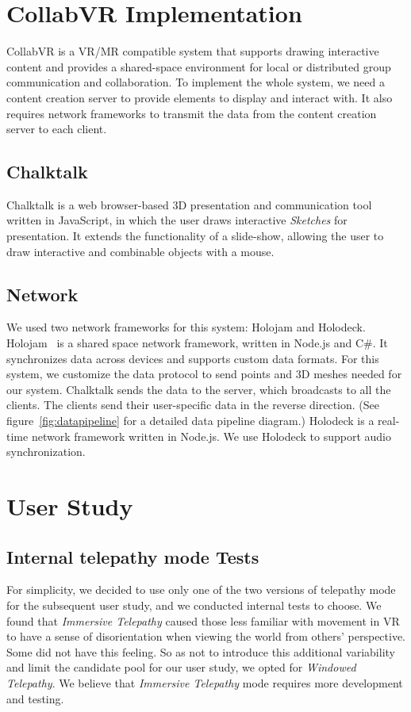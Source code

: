 \documentclass[chi_draft]{sigchi}
\begin{document}


\section{CollabVR Implementation}
CollabVR is a VR/MR compatible system that supports drawing interactive content and provides a shared-space environment for local or distributed group communication and collaboration. To implement the whole system, we need a content creation server to provide elements to display and interact with. It also requires network frameworks to transmit the data from the content creation server to each client. %
\subsection{Chalktalk} \label{sec:ct}
Chalktalk is a web browser-based 3D presentation and communication tool written in JavaScript, in which the user draws interactive \textit{Sketches} for presentation. It extends the functionality of a slide-show, allowing the user to draw interactive and combinable objects with a mouse.

\subsection{Network}
We used two network frameworks for this system: Holojam and Holodeck. Holojam~\cite{perlin2016future} is a shared space network framework, written in Node.js and C\#. It synchronizes data across devices and supports custom data formats. For this system, we customize the data protocol to send points and 3D meshes needed for our system. Chalktalk sends the data to the server, which broadcasts to all the clients. The clients send their user-specific data in the reverse direction. (See figure~\ref{fig:datapipeline} for a detailed data pipeline diagram.)
Holodeck is a real-time network framework written in Node.js. We use Holodeck to support audio synchronization.

\section{User Study}

\subsection{Internal telepathy mode Tests}
For simplicity, we decided to use only one of the two versions of telepathy mode for the subsequent user study, and we conducted internal tests to choose. We found that \textit{Immersive Telepathy} caused those less familiar with movement in VR to have a sense of disorientation when viewing the world from others' perspective. Some did not have this feeling. So as not to introduce this additional variability and limit the candidate pool for our user study, we opted for \textit{Windowed Telepathy}. We believe that \textit{Immersive Telepathy} mode requires more development and testing.
\end{document}
